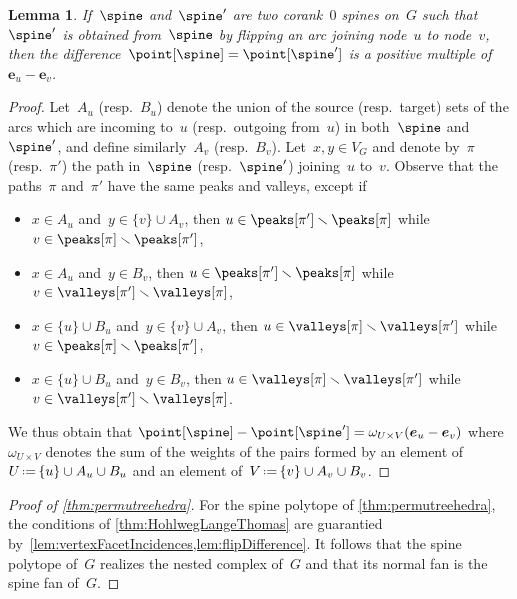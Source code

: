 \documentclass{amsart}
\newtheorem{lemma}[theorem]{Lemma}
\theoremstyle{definition}
\renewcommand{\b}[1]{{\boldsymbol{#1}}} %
\newcommand{\ssm}{\smallsetminus} %
\newcommand{\eqdef}{\mbox{\,\raisebox{0.2ex}{\scriptsize\ensuremath{\mathrm:}}\ensuremath{=}\,}} %
\newcommand{\weight}{\omega} %
\begin{document}
\begin{lemma}
  \label{lem:flipDifference}
  If~$\spine$ and~$\spine'$ are two corank~$0$ spines on~$G$ such that~$\spine'$ is obtained from~$\spine$ by flipping an arc joining node~$u$ to node~$v$, then the difference~$\point[\spine] = \point[\spine']$ is a positive multiple of~$\b{e}_u - \b{e}_v$.
\end{lemma}

\begin{proof}
  Let~$A_u$ (resp.~$B_u$) denote the union of the source (resp.~target) sets of the arcs which are incoming to~$u$ (resp.~outgoing from~$u$) in both~$\spine$ and~$\spine'$, and define similarly~$A_v$ (resp.~$B_v$).
  Let~$x,y \in V_G$ and denote by~$\pi$ (resp.~$\pi'$) the path in~$\spine$ (resp.~$\spine'$) joining~$u$ to~$v$.
  Observe that the paths~$\pi$ and~$\pi'$ have the same peaks and valleys, except if
  \begin{itemize}
    \item $x \in A_u$ and~$y \in \{v\} \cup A_v$, then $u \in \peaks[\pi'] \ssm \peaks[\pi]$ while~$v \in \peaks[\pi] \ssm \peaks[\pi']$,
    \item $x \in A_u$ and~$y \in B_v$, then $u \in \peaks[\pi'] \ssm \peaks[\pi]$ while~$v \in \valleys[\pi'] \ssm \valleys[\pi]$,
    \item $x \in \{u\} \cup B_u$ and~$y \in \{v\} \cup A_v$, then $u \in \valleys[\pi] \ssm \valleys[\pi']$ while~$v \in \peaks[\pi] \ssm \peaks[\pi']$,
    \item $x \in \{u\} \cup B_u$ and~$y \in B_v$, then $u \in \valleys[\pi] \ssm \valleys[\pi']$ while~$v \in \valleys[\pi'] \ssm \valleys[\pi]$.
  \end{itemize}
  We thus obtain that
  \(
    \point[\spine] - \point[\spine'] = \weight_{U \times V} (\b{e}_u - \b{e}_v)
  \)
  where~$\weight_{U \times V}$ denotes the sum of the weights of the pairs formed by an element of~$U \eqdef \{u\} \cup A_u \cup B_u$ and an element of~$V \eqdef \{v\} \cup A_v \cup B_v$.
\end{proof}

\begin{proof}[Proof of \cref{thm:permutreehedra}]
  For the spine polytope of \cref{thm:permutreehedra}, the conditions of \cref{thm:HohlwegLangeThomas} are guarantied by~\cref{lem:vertexFacetIncidences,lem:flipDifference}.
  It follows that the spine polytope of~$G$ realizes the nested complex of~$G$ and that its normal fan is the spine fan of~$G$.
\end{proof}
\end{document}
